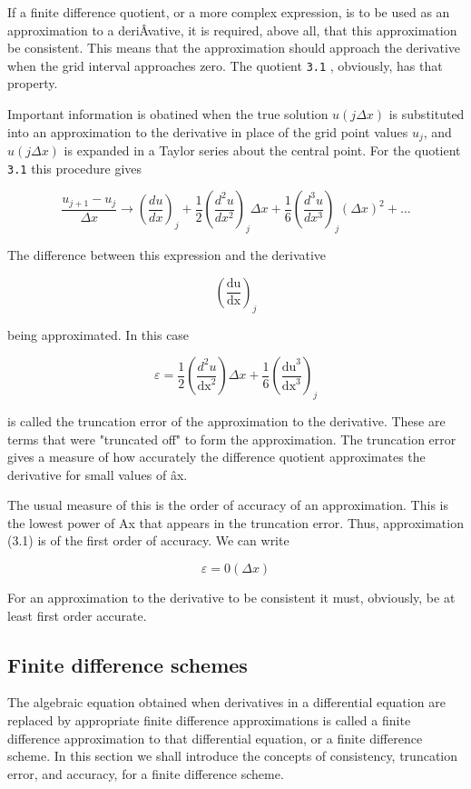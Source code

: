 If a finite difference quotient, or a more complex expression, is to be
used as an approximation to a deriÂ­vative, it is required, above all,
that this approximation be consistent. This means that the approximation
should approach the derivative when the grid interval approaches zero.
The quotient \texttt{3.1} , obviously, has that property.

Important information is obatined when the true solution
\(u (j\Delta x)\) is substituted into an approximation to the derivative
in place of the grid point values \(u_{j}\), and \(u(j\Delta x)\) is
expanded in a Taylor series about the central point. For the quotient
\texttt{3.1} this procedure gives

\[\frac{u_{j+1} - u_j}{\Delta x} \to \left( \frac{d u}{d x} \right)_j +
\frac{1}{2} \left( \frac{d^2 u}{dx^2} \right)_j \Delta x +
\frac{1}{6} \left( \frac{d^3 u}{dx^3} \right)_j
( \Delta x )^2 + \ldots\]

The difference between this expression and the derivative

\[\left( \frac{\text{du}}{\text{dx}} \right)_{j}\]

being approximated. In this case

\[\varepsilon = \frac{1}{2}\left( \frac{d^{2}u}{\text{dx}^{2}} \right)\Delta x + \frac{1}{6}\left( \frac{\text{du}^{3}}{\text{dx}^{3}} \right)_{j}\]

is called the truncation error of the approximation to the derivative.
These are terms that were "truncated off" to form the approximation. The
truncation error gives a measure of how accurately the difference
quotient approximates the derivative for small values of âx.

The usual measure of this is the order of accuracy of an approximation.
This is the lowest power of Ax that appears in the truncation error.
Thus, approximation (3.1) is of the first order of accuracy. We can
write

\[\varepsilon = 0(\Delta x)\]

For an approximation to the derivative to be consistent it must,
obviously, be at least first order accurate.

\subsection{\texorpdfstring{\textbf{Finite difference
schemes}}{Finite difference schemes}}\label{finite-difference-schemes}

The algebraic equation obtained when derivatives in a differential
equation are replaced by appropriate finite difference approximations is
called a finite difference approximation to that differential equation,
or a finite difference scheme. In this section we shall introduce the
concepts of consistency, truncation error, and accuracy, for a finite
difference scheme.


